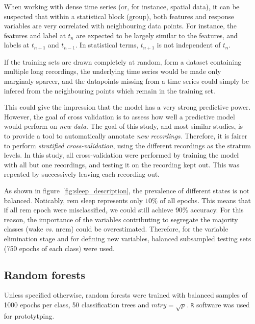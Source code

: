 When working with dense time series (or, for instance, spatial data), it can be suspected that within a statistical block (group),
both features and response variables are very correlated with neighbouring data points.
For instance, the features and label at $t_n$ are expected to be largely similar to the features, and labels at $t_{n+1}$ and $t_{n-1}$.
In statistical terms, $t_{n+1}$ is not independent of $t_{n}$.

If the training sets are drawn completely at random, form a dataset containing multiple long recordings, 
the underlying time series would be made only marginaly sparcer, and the datapoints missing from
a time series could simply be infered from the neighbouring points which remain in the training set.

This could give the impression that the model has a very strong predictive power.
However, the goal of cross validation is to assess how well a predictive model would perform on \emph{new data}. 
The goal of this study, and most similar studies, is to provide a tool to automatically annotate \emph{new recordings}. 
Therefore, it is fairer to perform \emph{stratified cross-validation}, using the different recordings as the stratum levels.
In this study, all cross-validation were performed by training the model with all but one recordings,
and testing it on the recording kept out. This was repeated by successively leaving each recording out.

As shown in figure~\ref{fig:sleep_description}, the prevalence of different states is not balanced. Noticably, \gls{rem} sleep represents only $10\%$ of all epochs.
This means that if all \gls{rem} epoch were misclassified, we could still achieve $90\%$ accuracy.
For this reason, the importance of the variables contributing to segregate the majority classes (wake \emph{vs.} \gls{nrem}) could be overestimated.
Therefore, for the variable elimination stage and for defining new variables,
balanced subsampled testing sets (750 epochs of each class) were used.

\subsection{Random forests}
Unless specified otherwise, random forests \citationneeded{} were trained with balanced samples of 1000 epochs per class,
50 classification trees and $mtry =\sqrt{p}$.
\texttt{R} software \citationneeded{} was used for prototytping.

